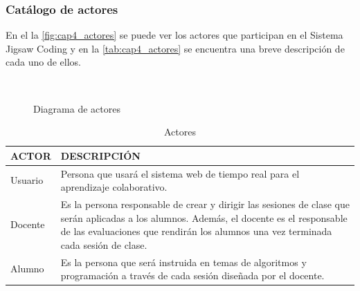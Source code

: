 \subsubsection{Catálogo de actores}
En el la \autoref{fig:cap4_actores} se puede ver los actores que participan en el Sistema Jigsaw Coding y en la \autoref{tab:cap4_actores} se encuentra una breve descripción de cada uno de ellos.
\begin{figure}
	\centering
	\\
	\caption[Diagrama de actores]{Diagrama de actores}
	\label{fig:cap4_actores}
\end{figure}
\clearpage
\begin{longtable}{L{3cm}L{7cm}}
	\caption{Actores}
	\label{tab:cap4_actores}\\
	\toprule[0.8mm]
	ACTOR & DESCRIPCIÓN \\
	\midrule[0.6mm]
	Usuario & Persona que usará el sistema web de tiempo real para el aprendizaje colaborativo.\\
	\midrule
	Docente & Es la persona responsable de crear y dirigir las sesiones de clase que serán aplicadas a los alumnos. Además, el docente es el responsable de las evaluaciones que rendirán los alumnos una vez terminada cada sesión de clase.\\
	\midrule
	Alumno & Es la persona que será instruida en temas de algoritmos y programación a través de cada sesión diseñada por el docente.\\
	\bottomrule[0.8mm]
\end{longtable}

